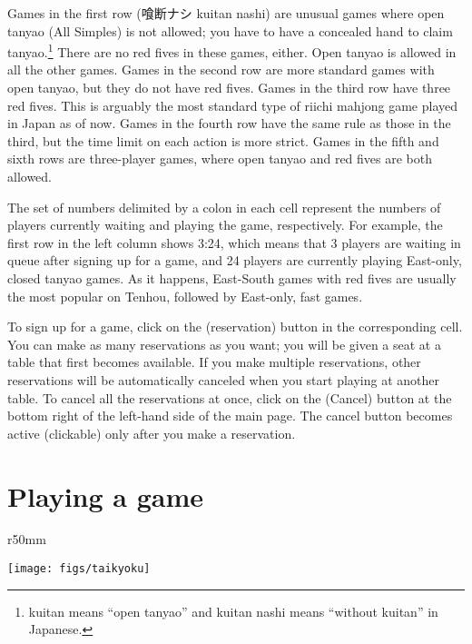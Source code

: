 \bigskip
Games in the first row (喰断ナシ {\jap kuitan nashi}) are unusual games where open {\jap tanyao} (All Simples) is not allowed; you have to have a concealed hand to claim {\jap tanyao}.\footnote{{\jap kuitan} means ``open {\jap tanyao}'' and {\jap kuitan nashi} means ``without {\jap kuitan}'' in Japanese.} There are no red fives in these games, either. 
Open {\jap tanyao} is allowed in all the other games. Games in the second row are more standard games with open {\jap tanyao}, but they do not have red fives. 
Games in the third row have three red fives. This is arguably the most standard type of riichi mahjong game played in Japan as of now. 
Games in the fourth row have the same rule as those in the third, but the time limit on each action is more strict. 
Games in the fifth and sixth rows are three-player games, where open {\jap tanyao} and red fives are both allowed. 

\bigskip
The set of numbers delimited by a colon in each cell represent the numbers of players currently waiting and playing the game, respectively. For example, the first row in the left column shows 3:24, which means that 3 players are waiting in queue after signing up for a game, and 24 players are currently playing East-only, closed {\jap tanyao} games. As it happens, East-South games with red fives are usually the most popular on {\jap Tenhou}, followed by East-only, fast games. 

\bigskip
To sign up for a game, click on the  (reservation) button in the corresponding cell. You can make as many reservations as you want; you will be given a seat at a table that first becomes available. If you make multiple reservations, other reservations will be automatically canceled when you start playing at another table. To cancel all the reservations at once, click on the  (Cancel) button at the bottom right of the left-hand side of the main page. The cancel button becomes active (clickable) only after you make a reservation. 

\newpage
\section{Playing a game}

\begin{wrapfigure}{r}{50mm}
\vspace{-20pt}
\begin{center}
\texttt{[image: figs/taikyoku]}
\end{center}
\vspace{-20pt}
\end{wrapfigure}


